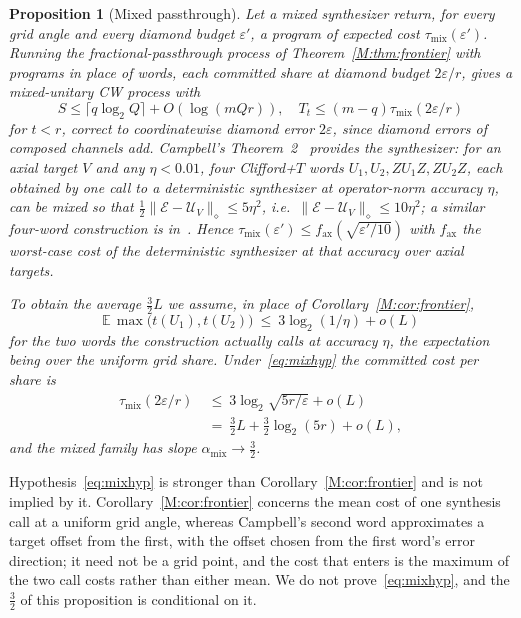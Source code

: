 \documentclass[aps,prx,twocolumn,superscriptaddress,nofootinbib,longbibliography]{revtex4-2}
\theoremstyle{plain}
\newtheorem{proposition}{Proposition}
\theoremstyle{definition}
\theoremstyle{remark}
\newcommand{\E}{\mathbb{E}}
\begin{document}
\begin{proposition}[Mixed passthrough]\label{prop:mixach}
Let a \emph{mixed synthesizer} return, for every grid angle and every diamond budget $\varepsilon'$, a program of expected cost $\tau_{\mathrm{mix}}(\varepsilon')$. Running the fractional-passthrough process of Theorem~\ref{M:thm:frontier} with programs in place of words, each committed share at diamond budget $2\varepsilon/r$, gives a mixed-unitary CW process with
\[
S\le\lceil q\log_2Q\rceil+O(\log(mQr)),\quad T_t\le(m-q)\tau_{\mathrm{mix}}(2\varepsilon/r)
\]
for $t<r$, correct to coordinatewise diamond error $2\varepsilon$, since diamond errors of composed channels add. Campbell's Theorem~2~\cite{Campbell17} provides the synthesizer: for an axial target $V$ and any $\eta<0.01$, four Clifford+$T$ words $U_1,U_2,ZU_1Z,ZU_2Z$, each obtained by one call to a deterministic synthesizer at operator-norm accuracy $\eta$, can be mixed so that $\tfrac12\|\mathcal E-\mathcal U_V\|_\diamond\le5\eta^2$, i.e.\ $\|\mathcal E-\mathcal U_V\|_\diamond\le10\eta^2$; a similar four-word construction is in~\cite{Hastings17}. Hence $\tau_{\mathrm{mix}}(\varepsilon')\le f_{\mathrm{ax}}(\sqrt{\varepsilon'/10})$ with $f_{\mathrm{ax}}$ the \emph{worst-case} cost of the deterministic synthesizer at that accuracy over axial targets. 

To obtain the average $\tfrac32L$ we assume, in place of Corollary~\ref{M:cor:frontier},
\begin{equation}\label{eq:mixhyp}
\E\,\max\big(t(U_1),t(U_2)\big)\ \le\ 3\log_2(1/\eta)+o(L)
\end{equation}
for the two words the construction actually calls at accuracy $\eta$, the expectation being over the uniform grid share. Under~\eqref{eq:mixhyp} the committed cost per share is
\[
\begin{aligned}
\tau_{\mathrm{mix}}(2\varepsilon/r)\ &\le\ 3\log_2\sqrt{5r/\varepsilon}+o(L)\\
&=\ \tfrac32L+\tfrac32\log_2(5r)+o(L),
\end{aligned}
\]
and the mixed family has slope $\alpha_{\mathrm{mix}}\to\tfrac32$.
\end{proposition}
Hypothesis~\eqref{eq:mixhyp} is stronger than Corollary~\ref{M:cor:frontier} and is not implied by it. Corollary~\ref{M:cor:frontier} concerns the mean cost of one synthesis call at a uniform grid angle, whereas Campbell's second word approximates a target offset from the first, with the offset chosen from the first word's error direction; it need not be a grid point, and the cost that enters is the maximum of the two call costs rather than either mean. We do not prove~\eqref{eq:mixhyp}, and the $\tfrac32$ of this proposition is conditional on it.
\end{document}
